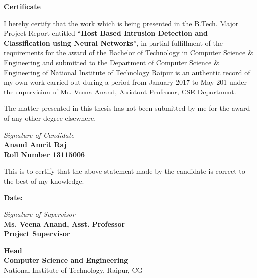 \documentclass[12pt]{article}
\newcommand{\projectTitle}{Host Based Intrusion Detection and Classification using Neural Networks}
\newcommand{\quotes}[1]{``#1''}
\theoremstyle{definition}
\begin{document}
	
	\begin{titlepage}
		
		\textbf{%
			\hfill
			\Large Certificate \hfill\hfill\\
		}
		\vspace{15pt}
		
		I hereby certify that the work which is being presented in the B.Tech. Major Project Report entitled \quotes{\textbf{\projectTitle}}, in partial fulfillment of the requirements for the award of the Bachelor  of Technology in Computer Science \& Engineering and submitted to the Department of Computer Science \& Engineering of National Institute of Technology Raipur  is an authentic record of my own work carried out during a period from January 2017 to May 201 under the supervision of  Ms. Veena Anand, Assistant Professor, CSE Department. 

		The matter presented in this thesis has not been submitted by me for the award of any other degree elsewhere.\\
		[.25in]
		\begin{flushright}
			\textit{Signature of Candidate}\\
				\textbf{Anand Amrit Raj \\
				Roll Number 13115006\\}
		\end{flushright}
	\vspace{10pt}
	This is to certify that the above statement made by the candidate is correct to the best of my knowledge.

		\begin{flushleft}
			\textbf{Date:}
		\end{flushleft}
		\begin{flushright}
			\textit{Signature of Supervisor}\\
				\textbf{Ms. Veena Anand, Asst. Professor\\
				Project Supervisor\\}
		\end{flushright}
		\vspace{30pt}
		\begin{flushleft}
			\textbf{\large Head}\\
			\textbf{Computer Science and Engineering}\\
			National Institute of Technology, Raipur, CG
		\end{flushleft}
	\end{titlepage}
	
\end{document}
